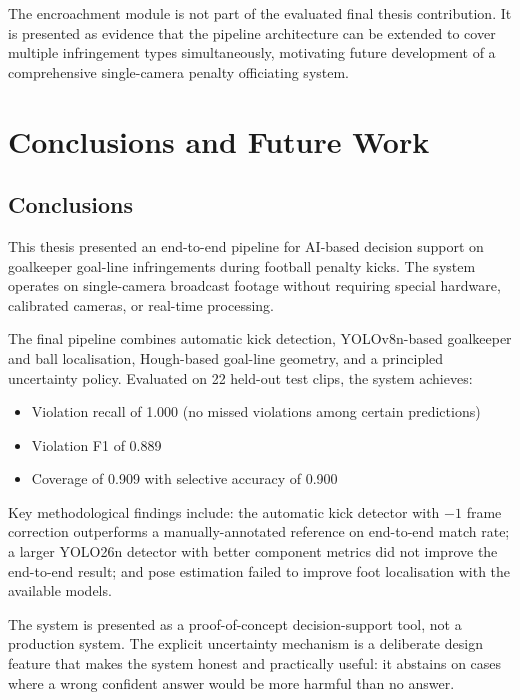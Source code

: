 \documentclass[12pt,a4paper,twoside]{article}
\begin{document}
The encroachment module is not part of the evaluated final thesis contribution.
It is presented as evidence that the pipeline architecture can be extended
to cover multiple infringement types simultaneously, motivating future development
of a comprehensive single-camera penalty officiating system.


\section{Conclusions and Future Work}
\label{sec:conclusion}

\subsection{Conclusions}

This thesis presented an end-to-end pipeline for AI-based decision support on
goalkeeper goal-line infringements during football penalty kicks. The system
operates on single-camera broadcast footage without requiring special hardware,
calibrated cameras, or real-time processing.

The final pipeline combines automatic kick detection, YOLOv8n-based goalkeeper
and ball localisation, Hough-based goal-line geometry, and a principled
uncertainty policy. Evaluated on 22 held-out test clips, the system achieves:
\begin{itemize}
  \item Violation recall of 1.000 (no missed violations among certain predictions)
  \item Violation F1 of 0.889
  \item Coverage of 0.909 with selective accuracy of 0.900
\end{itemize}

Key methodological findings include: the automatic kick detector with $-1$ frame
correction outperforms a manually-annotated reference on end-to-end match rate;
a larger YOLO26n detector with better component metrics did not improve the
end-to-end result; and pose estimation failed to improve foot localisation with
the available models.

The system is presented as a proof-of-concept decision-support tool, not a
production system. The explicit uncertainty mechanism is a deliberate design
feature that makes the system honest and practically useful: it abstains on
cases where a wrong confident answer would be more harmful than no answer.
\end{document}
